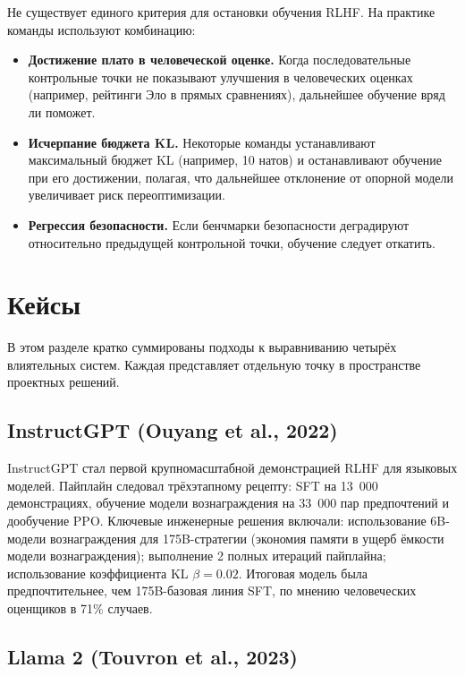Не существует единого критерия для остановки обучения RLHF. На практике команды используют комбинацию:
\begin{itemize}[leftmargin=*]
  \item \textbf{Достижение плато в человеческой оценке.} Когда последовательные контрольные точки не показывают улучшения в человеческих оценках (например, рейтинги Эло в прямых сравнениях), дальнейшее обучение вряд ли поможет.
  \item \textbf{Исчерпание бюджета KL.} Некоторые команды устанавливают максимальный бюджет KL (например, 10 натов) и останавливают обучение при его достижении, полагая, что дальнейшее отклонение от опорной модели увеличивает риск переоптимизации.
  \item \textbf{Регрессия безопасности.} Если бенчмарки безопасности деградируют относительно предыдущей контрольной точки, обучение следует откатить.
\end{itemize}

\section{Кейсы}
\label{sec:case-studies}

В этом разделе кратко суммированы подходы к выравниванию четырёх влиятельных систем. Каждая представляет отдельную точку в пространстве проектных решений.

\subsection{InstructGPT (Ouyang et al., 2022)}

InstructGPT стал первой крупномасштабной демонстрацией RLHF для языковых моделей. Пайплайн следовал трёхэтапному рецепту: SFT на 13~000 демонстрациях, обучение модели вознаграждения на 33~000 пар предпочтений и дообучение PPO. Ключевые инженерные решения включали: использование 6B-модели вознаграждения для 175B-стратегии (экономия памяти в ущерб ёмкости модели вознаграждения); выполнение 2 полных итераций пайплайна; использование коэффициента KL $\beta = 0.02$. Итоговая модель была предпочтительнее, чем 175B-базовая линия SFT, по мнению человеческих оценщиков в 71\% случаев.

\subsection{Llama 2 (Touvron et al., 2023)}

